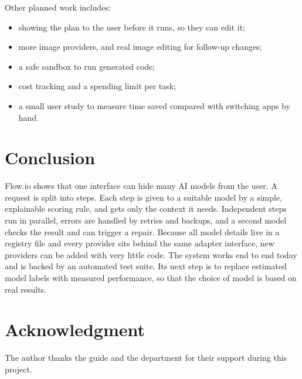\documentclass[conference]{IEEEtran}
\begin{document}
Other planned work includes:
\begin{itemize}
\item showing the plan to the user before it runs, so they can edit it;
\item more image providers, and real image editing for follow-up changes;
\item a safe sandbox to run generated code;
\item cost tracking and a spending limit per task;
\item a small user study to measure time saved compared with switching apps by hand.
\end{itemize}

\section{Conclusion}
Flow.io shows that one interface can hide many AI models from the user. A request is split into steps.
Each step is given to a suitable model by a simple, explainable scoring rule, and gets only the context it
needs. Independent steps run in parallel, errors are handled by retries and backups, and a second model
checks the result and can trigger a repair. Because all model details live in a registry file and every
provider sits behind the same adapter interface, new providers can be added with very little code. The
system works end to end today and is backed by an automated test suite. Its next step is to replace
estimated model labels with measured performance, so that the choice of model is based on real results.

\section*{Acknowledgment}
The author thanks the guide and the department for their support during this project.
\end{document}
